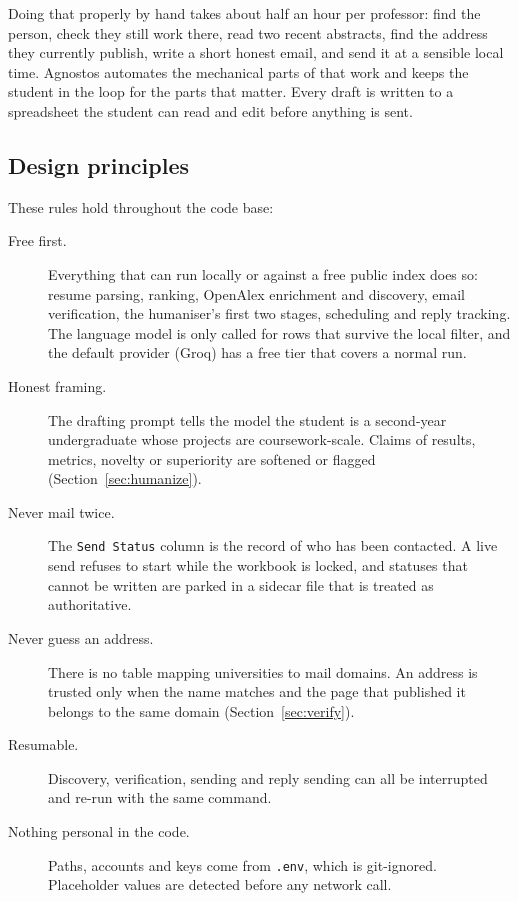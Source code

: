 \documentclass[11pt,a4paper]{article}
\newcommand{\code}[1]{\texttt{#1}}
\begin{document}
Doing that properly by hand takes about half an hour per professor: find the person, check they
still work there, read two recent abstracts, find the address they currently publish, write a
short honest email, and send it at a sensible local time. Agnostos automates the mechanical
parts of that work and keeps the student in the loop for the parts that matter. Every draft is
written to a spreadsheet the student can read and edit before anything is sent.

\subsection{Design principles}
These rules hold throughout the code base:

\begin{description}
  \item[Free first.] Everything that can run locally or against a free public index does so:
        resume parsing, ranking, OpenAlex enrichment and discovery, email verification, the
        humaniser's first two stages, scheduling and reply tracking. The language model is only
        called for rows that survive the local filter, and the default provider (Groq) has a
        free tier that covers a normal run.
  \item[Honest framing.] The drafting prompt tells the model the student is a second-year
        undergraduate whose projects are coursework-scale. Claims of results, metrics, novelty
        or superiority are softened or flagged (Section~\ref{sec:humanize}).
  \item[Never mail twice.] The \code{Send Status} column is the record of who has been
        contacted. A live send refuses to start while the workbook is locked, and statuses that
        cannot be written are parked in a sidecar file that is treated as authoritative.
  \item[Never guess an address.] There is no table mapping universities to mail domains. An
        address is trusted only when the name matches and the page that published it belongs to
        the same domain (Section~\ref{sec:verify}).
  \item[Resumable.] Discovery, verification, sending and reply sending can all be interrupted
        and re-run with the same command.
  \item[Nothing personal in the code.] Paths, accounts and keys come from \code{.env}, which is
        git-ignored. Placeholder values are detected before any network call.
\end{description}
\end{document}
